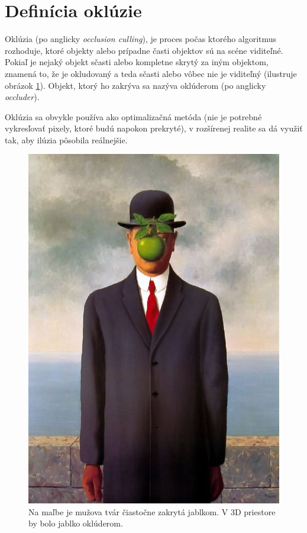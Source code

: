 \section{Definícia oklúzie}

Oklúzia (po anglicky \emph{occlusion culling}), je proces počas ktorého algoritmus rozhoduje, ktoré objekty alebo prípadne časti objektov sú na scéne viditeľné. Pokiaľ je nejaký objekt sčasti alebo kompletne skrytý za iným objektom, znamená to, že je okludovaný a teda sčasti alebo vôbec nie je viditeľný (ilustruje obrázok \ref{sonofman}). Objekt, ktorý ho zakrýva sa nazýva oklúderom (po anglicky \emph{occluder}).

Oklúzia sa obvykle používa ako optimalizačná metóda (nie je potrebné vykresľovať pixely, ktoré budú napokon prekryté), v rozšírenej realite sa dá využiť tak, aby ilúzia pôsobila reálnejšie.

\begin{figure}[h]
 \centering
 \includegraphics[scale=0.3]{pictures/sonofman.jpg}
 \caption[Na maľbe je mužova tvár čiastočne zakrytá jablkom. V 3D priestore by bolo jablko oklúderom.]{Na maľbe je mužova tvár čiastočne zakrytá jablkom\footnotemark. V 3D priestore by bolo jablko oklúderom.}
 \label{sonofman}
\end{figure}
